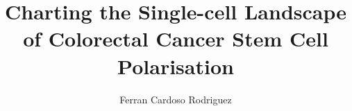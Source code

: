 
\title{Charting the Single-cell Landscape of Colorectal Cancer Stem Cell Polarisation}
\author{Ferran Cardoso Rodriguez}

\maketitle

\makedeclaration





